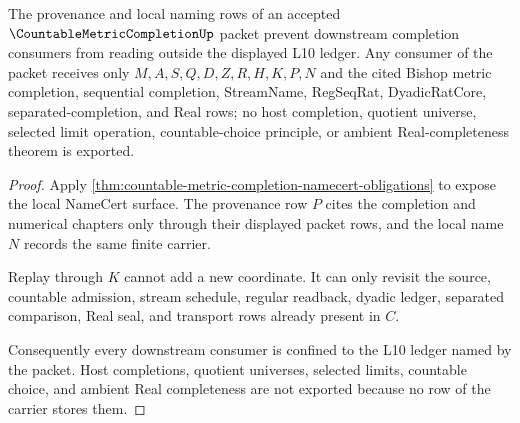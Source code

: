 \begin{theorem}
\label{thm:countable-metric-completion-ledger-nonescape}
The provenance and local naming rows of an accepted $\CountableMetricCompletionUp$ packet prevent downstream completion consumers from reading outside the displayed L10 ledger. Any consumer of the packet receives only $M,A,S,Q,D,Z,R,H,K,P,N$ and the cited Bishop metric completion, sequential completion, StreamName, RegSeqRat, DyadicRatCore, separated-completion, and Real rows; no host completion, quotient universe, selected limit operation, countable-choice principle, or ambient Real-completeness theorem is exported.
\end{theorem}
\begin{proof}
Apply \autoref{thm:countable-metric-completion-namecert-obligations} to expose the local NameCert surface. The provenance row $P$ cites the completion and numerical chapters only through their displayed packet rows, and the local name $N$ records the same finite carrier.

Replay through $K$ cannot add a new coordinate. It can only revisit the source, countable admission, stream schedule, regular readback, dyadic ledger, separated comparison, Real seal, and transport rows already present in $C$.

Consequently every downstream consumer is confined to the L10 ledger named by the packet. Host completions, quotient universes, selected limits, countable choice, and ambient Real completeness are not exported because no row of the carrier stores them.
\end{proof}

\begin{closurestatus}{\CountableMetricCompletionUp}
  \theoryclosure{\seedClosure}
  \formalstatus{\unformalizedV}
\end{closurestatus}
